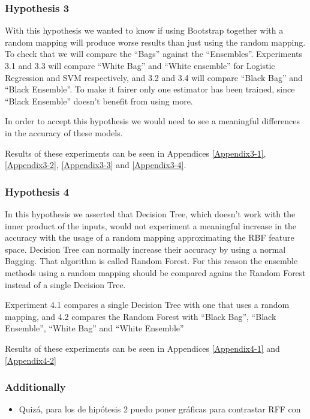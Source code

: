   \begin{pre-delivery}
  \subsubsection*{Hypothesis 3}

  With this hypothesis we wanted to know if using Bootstrap together with a
  random mapping will produce worse results than just using the random
  mapping. To check that we will compare the ``Bags'' against the ``Ensembles''.
  Experiments 3.1 and 3.3 will compare ``White Bag'' and ``White ensemble'' for
  Logistic Regression and SVM respectively, and 3.2 and 3.4 will compare
  ``Black Bag'' and ``Black Ensemble''. To make it fairer only one estimator
  has been trained, since ``Black Ensemble'' doesn't benefit from using more.

  In order to accept this hypothesis we would need to see a meaningful
  differences in the accuracy of these models.

  Results of these experiments can be seen in Appendices
  \ref{Appendix3-1},
  \ref{Appendix3-2},
  \ref{Appendix3-3} and
  \ref{Appendix3-4}.



  \subsubsection*{Hypothesis 4}

  In this hypothesis we asserted that Decision Tree, which doesn't work with
  the inner product of the inputs, would not experiment a meaningful increase
  in the accuracy with the usage of a random mapping approximating the
  RBF feature space. Decision Tree can normally increase their accuracy
  by using a normal Bagging. That algorithm is called Random Forest. For this
  reason the ensemble methods using a random mapping should be compared agains
  the Random Forest instead of a single Decision Tree.

  Experiment 4.1 compares a single Decision Tree with one that uses a
  random mapping, and 4.2 compares the Random Forest with
  ``Black Bag'',
  ``Black Ensemble'',
  ``White Bag'' and
  ``White Ensemble''

  Results of these experiments can be seen in Appendices \ref{Appendix4-1}
  and \ref{Appendix4-2}
\end{pre-delivery}
\begin{note}
  \subsubsection*{Additionally}
  \begin{itemize}
    \item Quizá, para los de hipótesis 2 puedo poner gráficas para contrastar
    RFF con \Nys
  \end{itemize}
\end{note}

